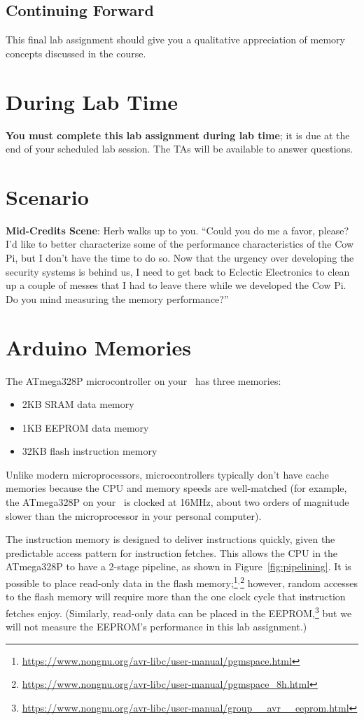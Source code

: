 \subsection*{Continuing Forward}

This final lab assignment should give you a qualitative appreciation of memory
concepts discussed in the course.

\section*{During Lab Time}

\textbf{You must complete this lab assignment during lab time}; it is due at the
end of your scheduled lab session. The TAs will be available to answer
questions.

\section{Scenario}

{\large \textbf{Mid-Credits Scene}:} Herb walks up to you. ``Could you do me a
favor, please? I'd like to better characterize some of the performance
characteristics of the Cow Pi, but I don't have the time to do so. Now that the
urgency over developing the security systems is behind us, I need to get back to
Eclectic Electronics to clean up a couple of messes that I had to leave there
while we developed the Cow Pi. Do you mind measuring the memory performance?''

\section{Arduino Memories}

The ATmega328P microcontroller on your \nano\ has three memories:
\begin{itemize}
\item 2KB SRAM data memory
\item 1KB EEPROM data memory
\item 32KB flash instruction memory
\end{itemize}

Unlike modern microprocessors, microcontrollers typically don't have cache
memories because the CPU and memory speeds are well-matched (for example,
the ATmega328P on your \nano\ is clocked at 16MHz, about two orders of
magnitude slower than the microprocessor in your personal computer).

The instruction memory is designed to deliver instructions quickly, given the
predictable access pattern for instruction fetches. This allows the CPU in the
ATmega328P to have a 2-stage pipeline, as shown in Figure~\ref{fig:pipelining}.
It is possible to place read-only data in the flash
memory;\footnote{\url{https://www.nongnu.org/avr-libc/user-manual/pgmspace.html}}$^,$\footnote{\url{https://www.nongnu.org/avr-libc/user-manual/pgmspace_8h.html}}
however, random accesses to the flash memory will require more than the one
clock cycle that instruction fetches enjoy. (Similarly, read-only data can be
placed in the EEPROM,\footnote{\url{https://www.nongnu.org/avr-libc/user-manual/group__avr__eeprom.html}}
but we will not measure the EEPROM's performance in this lab assignment.)

